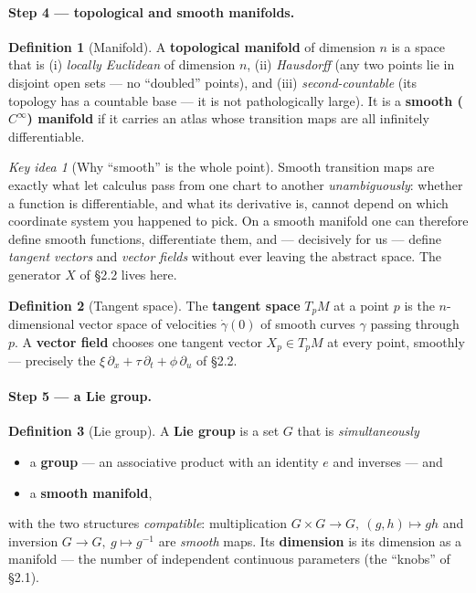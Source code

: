 \documentclass[11pt]{article}
\theoremstyle{definition}
\newtheorem{definition}{Definition}[section]
\theoremstyle{remark}
\newtheorem*{keyidea}{Key idea}
\begin{document}
\paragraph{Step 4 --- topological and smooth manifolds.}
\begin{definition}[Manifold]
A \textbf{topological manifold} of dimension $n$ is a space that is (i) \emph{locally Euclidean} of
dimension $n$, (ii) \emph{Hausdorff} (any two points lie in disjoint open sets --- no ``doubled'' points),
and (iii) \emph{second-countable} (its topology has a countable base --- it is not pathologically large).
It is a \textbf{smooth ($C^\infty$) manifold} if it carries an atlas whose transition maps are all
infinitely differentiable.
\end{definition}

\begin{keyidea}[Why ``smooth'' is the whole point]
Smooth transition maps are exactly what let calculus pass from one chart to another \emph{unambiguously}:
whether a function is differentiable, and what its derivative is, cannot depend on which coordinate system
you happened to pick. On a smooth manifold one can therefore define smooth functions, differentiate them,
and --- decisively for us --- define \emph{tangent vectors} and \emph{vector fields} without ever leaving
the abstract space. The generator $X$ of \S2.2 lives here.
\end{keyidea}

\begin{definition}[Tangent space]
The \textbf{tangent space} $T_pM$ at a point $p$ is the $n$-dimensional vector space of velocities
$\dot\gamma(0)$ of smooth curves $\gamma$ passing through $p$. A \textbf{vector field} chooses one tangent
vector $X_p\in T_pM$ at every point, smoothly --- precisely the
$\xi\,\partial_x+\tau\,\partial_t+\phi\,\partial_u$ of \S2.2.
\end{definition}

\paragraph{Step 5 --- a Lie group.}
\begin{definition}[Lie group]
A \textbf{Lie group} is a set $G$ that is \emph{simultaneously}
\begin{itemize}[nosep]
  \item a \textbf{group} --- an associative product with an identity $e$ and inverses --- and
  \item a \textbf{smooth manifold},
\end{itemize}
with the two structures \emph{compatible}: multiplication $G\times G\to G,\ (g,h)\mapsto gh$ and inversion
$G\to G,\ g\mapsto g^{-1}$ are \emph{smooth} maps. Its \textbf{dimension} is its dimension as a manifold ---
the number of independent continuous parameters (the ``knobs'' of \S2.1).
\end{definition}
\end{document}
